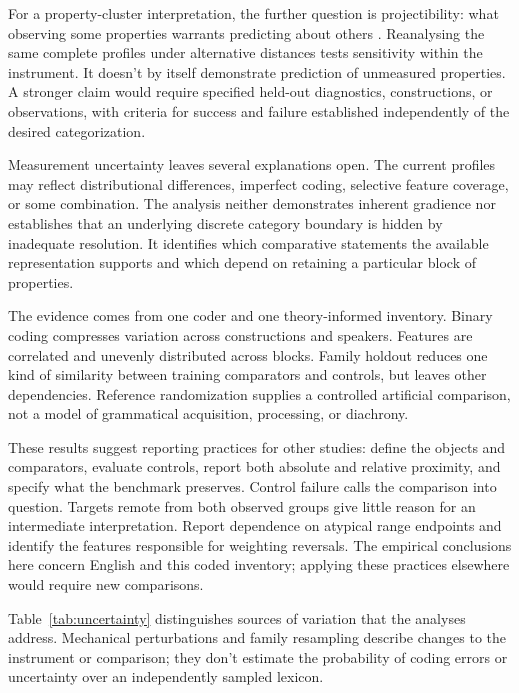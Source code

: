 \documentclass[12pt]{article}
\begin{document}
For a property-cluster interpretation, the further question is projectibility: what observing some properties warrants predicting about others \citep{Goodman1955}. Reanalysing the same complete profiles under alternative distances tests sensitivity within the instrument. It doesn't by itself demonstrate prediction of unmeasured properties. A stronger claim would require specified held-out diagnostics, constructions, or observations, with criteria for success and failure established independently of the desired categorization.

Measurement uncertainty leaves several explanations open. The current profiles may reflect distributional differences, imperfect coding, selective feature coverage, or some combination. The analysis neither demonstrates inherent gradience nor establishes that an underlying discrete category boundary is hidden by inadequate resolution. It identifies which comparative statements the available representation supports and which depend on retaining a particular block of properties.

The evidence comes from one coder and one theory-informed inventory. Binary coding compresses variation across constructions and speakers. Features are correlated and unevenly distributed across blocks. Family holdout reduces one kind of similarity between training comparators and controls, but leaves other dependencies. Reference randomization supplies a controlled artificial comparison, not a model of grammatical acquisition, processing, or diachrony.

These results suggest reporting practices for other studies: define the objects and comparators, evaluate controls, report both absolute and relative proximity, and specify what the benchmark preserves. Control failure calls the comparison into question. Targets remote from both observed groups give little reason for an intermediate interpretation. Report dependence on atypical range endpoints and identify the features responsible for weighting reversals. The empirical conclusions here concern English and this coded inventory; applying these practices elsewhere would require new comparisons.

Table~\ref{tab:uncertainty} distinguishes sources of variation that the analyses address. Mechanical perturbations and family resampling describe changes to the instrument or comparison; they don't estimate the probability of coding errors or uncertainty over an independently sampled lexicon.
\end{document}

